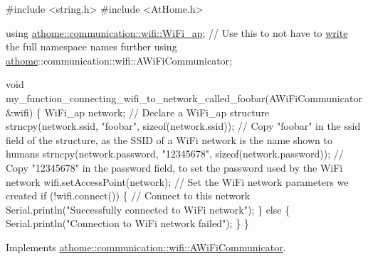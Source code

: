 \begin{DoxyCode}
\textcolor{preprocessor}{#include <string.h>}
\textcolor{preprocessor}{#include <AtHome.h>}

\textcolor{keyword}{using} \mbox{\hyperlink{structathome_1_1communication_1_1wifi_1_1s__wifi__access__point}{athome::communication::wifi::WiFi\_ap}}; \textcolor{comment}{// Use this to not have to}
\mbox{\hyperlink{classathome_1_1communication_1_1wifi_1_1_e_s_p8266_wi_fi_communicator_afd3c1c4ce7d68717a7bb2cf1b9dc962f}{write}} the full \textcolor{keyword}{namespace }names further using
\mbox{\hyperlink{namespaceathome}{athome}}::communication::wifi::AWiFiCommunicator;

void my\_function\_connecting\_wifi\_to\_network\_called\_foobar(AWiFiCommunicator
&wifi) \{ WiFi\_ap network; \textcolor{comment}{// Declare a WiFi\_ap structure}
  strncpy(network.ssid, \textcolor{stringliteral}{"foobar"}, \textcolor{keyword}{sizeof}(network.ssid)); \textcolor{comment}{// Copy "foobar"}
in the ssid field of the structure, as the SSID of a WiFi network is the
name shown to humans strncpy(network.password, \textcolor{stringliteral}{"12345678"},
\textcolor{keyword}{sizeof}(network.password)); \textcolor{comment}{// Copy "12345678" in the password field, to set}
the password used by the WiFi network wifi.setAccessPoint(network); \textcolor{comment}{// Set}
the WiFi network parameters we created \textcolor{keywordflow}{if} (!wifi.connect()) \{ \textcolor{comment}{// Connect to}
\textcolor{keyword}{this} network Serial.println(\textcolor{stringliteral}{"Successfully connected to WiFi network"}); \}
\textcolor{keywordflow}{else} \{ Serial.println(\textcolor{stringliteral}{"Connection to WiFi network failed"});
  \}
\}
\end{DoxyCode}
 

Implements \mbox{\hyperlink{classathome_1_1communication_1_1wifi_1_1_a_wi_fi_communicator_a309927109fbc19aa0fb2afb71d50bbf9}{athome\+::communication\+::wifi\+::\+A\+Wi\+Fi\+Communicator}}.

\mbox{\label{classathome_1_1communication_1_1wifi_1_1_e_s_p8266_wi_fi_communicator_a159a93b350df135daa967665c9e53e2f}} 
